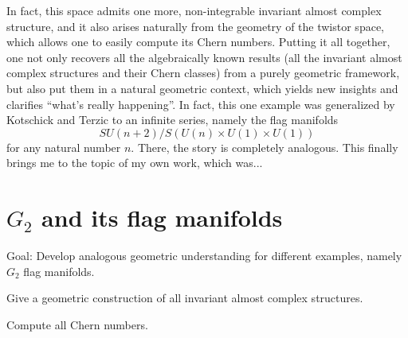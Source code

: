 \documentclass[parskip=half]{scrartcl}
\begin{document}
In fact, this space admits one more, non-integrable invariant almost complex structure, and it also arises naturally from the geometry of the twistor space, which allows one to easily compute its Chern numbers. Putting it all together, one not only recovers all the algebraically known results (all the invariant almost complex structures and their Chern classes) from a purely geometric framework, but also put them in a natural geometric context, which yields new insights and clarifies ``what's really happening''. In fact, this one example was generalized by Kotschick and Terzic to an infinite series, namely the flag manifolds
\begin{equation*}
	SU(n+2)/S(U(n)\times U(1)\times U(1))
\end{equation*}
for any natural number $n$. There, the story is completely analogous. This finally brings me to the topic of my own work, which was...

\section{$G_2$ and its flag manifolds}

\begin{onboard}
	Goal: Develop analogous geometric understanding for different examples, namely $G_2$ flag manifolds. 
	\begin{numberedlist}
		\item Give a geometric construction of all invariant almost complex structures.
		\item Compute all Chern numbers.
	\end{numberedlist}
\end{onboard}









\section{}
\end{document}
